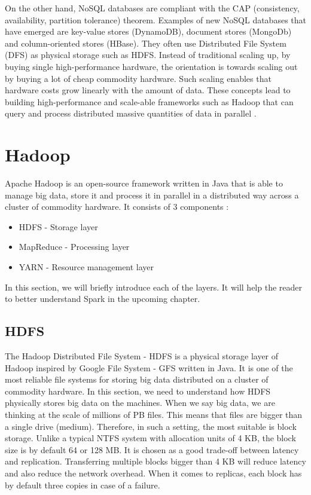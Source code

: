 On the other hand, NoSQL databases are compliant with the CAP (consistency, availability, partition tolerance) theorem.  Examples of new NoSQL databases that have emerged are key-value stores (DynamoDB), document stores (MongoDb) and column-oriented stores (HBase). They often use Distributed File System (DFS) as physical storage such as HDFS. Instead of traditional scaling up, by buying single high-performance hardware, the orientation is towards scaling out by buying a lot of cheap commodity hardware. Such scaling enables that hardware costs grow linearly with the amount of data.  These concepts lead to building high-performance and scale-able frameworks such as Hadoop that can query and process distributed massive quantities of data in parallel \cite{BigDataCourse}. %

\section{Hadoop}
Apache Hadoop \cite{Hadoop} is an open-source framework written in Java that is able to manage big data, store it and process it in parallel in a distributed way across a cluster of commodity hardware. It consists of 3 components \cite{BigDataCourse}: %
\begin{itemize}
	\item HDFS - Storage layer
	\item MapReduce - Processing layer
	\item YARN - Resource management layer
\end{itemize}

In this section, we will briefly introduce each of the layers. It will help the reader to better understand Spark in the upcoming chapter.

\subsection{HDFS}
The Hadoop Distributed File System - HDFS \cite{HDFS} is a physical storage layer of Hadoop inspired by Google File System - GFS \cite{GFS} written in Java. It is one of the most reliable file systems for storing big data distributed on a cluster of commodity hardware. In this section, we need to understand how HDFS physically stores big data on the machines. When we say big data, we are thinking at the scale of millions of PB files. This means that files are bigger than a single drive (medium). Therefore, in such a setting, the most suitable is block storage. Unlike a typical NTFS system with allocation units of 4 KB, the block size is by default 64 or 128 MB. It is chosen as a good trade-off between latency and replication. Transferring multiple blocks bigger than 4 KB will reduce latency and also reduce the network overhead. When it comes to replicas, each block has by default three copies in case of a failure.  

